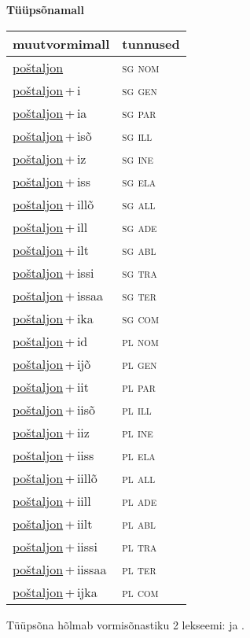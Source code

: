 
\vspace{1.8em}
\begin{minipage}{\textwidth}
\textbf{Tüüpsõnamall \,}\\

\begin{sideways}
\begin{tabular}{l l}
muutvormimall & tunnused \\
\hline
\underline{poštaljon} & \textsc{ sg nom } \\
\underline{poštaljon}\,+\,i & \textsc{ sg gen } \\
\underline{poštaljon}\,+\,ia & \textsc{ sg par } \\
\underline{poštaljon}\,+\,isõ & \textsc{ sg ill } \\
\underline{poštaljon}\,+\,iz & \textsc{ sg ine } \\
\underline{poštaljon}\,+\,iss & \textsc{ sg ela } \\
\underline{poštaljon}\,+\,illõ & \textsc{ sg all } \\
\underline{poštaljon}\,+\,ill & \textsc{ sg ade } \\
\underline{poštaljon}\,+\,ilt & \textsc{ sg abl } \\
\underline{poštaljon}\,+\,issi & \textsc{ sg tra } \\
\underline{poštaljon}\,+\,issaa & \textsc{ sg ter } \\
\underline{poštaljon}\,+\,ika & \textsc{ sg com } \\
\underline{poštaljon}\,+\,id & \textsc{ pl nom } \\
\underline{poštaljon}\,+\,ijõ & \textsc{ pl gen } \\
\underline{poštaljon}\,+\,iit & \textsc{ pl par } \\
\underline{poštaljon}\,+\,iisõ & \textsc{ pl ill } \\
\underline{poštaljon}\,+\,iiz & \textsc{ pl ine } \\
\underline{poštaljon}\,+\,iiss & \textsc{ pl ela } \\
\underline{poštaljon}\,+\,iillõ & \textsc{ pl all } \\
\underline{poštaljon}\,+\,iill & \textsc{ pl ade } \\
\underline{poštaljon}\,+\,iilt & \textsc{ pl abl } \\
\underline{poštaljon}\,+\,iissi & \textsc{ pl tra } \\
\underline{poštaljon}\,+\,iissaa & \textsc{ pl ter } \\
\underline{poštaljon}\,+\,ijka & \textsc{ pl com } \\
\end{tabular}
\end{sideways}
\label{tab:tüüpsõnamall-poštaljon}

\end{minipage}

 
\vspace{1em}
\noindent Tüüpsõna hõlmab vormisõnastiku 2 lekseemi:  ja .
